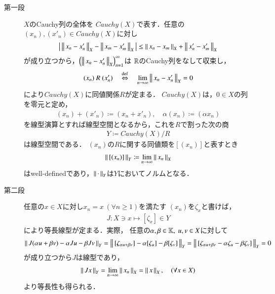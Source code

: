 	\begin{prf}\mbox{}
		\begin{description}
			\item[第一段]
				$X$のCauchy列の全体を
				$Cauchy(X)$で表す．任意の$(x_n),(x'_n) \in Cauchy(X)$に対し
				\begin{align}
					\left|\, \left\|\, x_n - x'_n\, \right\|_{X} - \left\|\, x_m - x'_m\, \right\|_{X}\, \right|
					\leq \left\|\, x_n - x_m\, \right\|_{X} + \left\|\, x'_n - x'_m\, \right\|_{X}
				\end{align}
				が成り立つから，$\left( \left\|\, x_n - x'_n\, \right\|_{X} \right)_{n=1}^\infty$は
				$\mathbb{R}$のCauchy列をなして収束し，
				\begin{align}
					(x_n)\ R\ (x'_n)
					\quad \overset{\mathrm{def}}{\Leftrightarrow} \quad \lim_{n \to \infty} \left\|\, x_n - x'_n\, \right\|_{X} = 0
				\end{align}
				により$Cauchy(X)$に同値関係$R$が定まる．
				$Cauchy(X)$は，$0 \in X$の列を零元と定め，
				\begin{align}
					(x_n) + (x'_n) \coloneqq (x_n + x'_n),
					\quad \alpha (x_n) \coloneqq (\alpha x_n)
				\end{align}
				を線型演算とすれば線型空間となるから，これを$R$で割った次の商
				\begin{align}
					Y \coloneqq Cauchy(X) / R
				\end{align}
				は線型空間である．
				$(x_n)$の$R$に関する同値類を$[(x_n)]$と表すとき
				\begin{align}
					\left\|\, [(x_n)]\, \right\|_{Y} \coloneqq \lim_{n \to \infty} \left\|\, x_n\, \right\|_{X}
					\label{eq:thm_expansion_of_normed_space_1}
				\end{align}
				はwell-definedであり，$\left\|\, \cdot\, \right\|_{Y}$は$Y$においてノルムとなる．
			
			\item[第二段]
				任意の$x \in X$に対し$x_n = x\ (\forall n \geq 1)$を満たす
				$(x_n)$を$\zeta_x$と書けば，
				\begin{align}
					J: X \ni x \longmapsto [\zeta_x] \in Y
					\label{eq:thm_expansion_of_normed_space_2}
				\end{align}
				により等長線型が定まる．実際，
				任意の$\alpha,\beta \in \mathbb{K},\ u,v \in X$に対して
				\begin{align}
					\left\|\, J (\alpha u + \beta v) - \alpha J u - \beta J v\, \right\|_{Y}
					= \left\|\, [\zeta_{\alpha u + \beta v}] - \alpha [\zeta_u] - \beta [\zeta_v]\, \right\|_{Y}
					= \left\|\, [\zeta_{\alpha u + \beta v} - \alpha \zeta_u - \beta \zeta_v]\, \right\|_{Y}
					= 0
				\end{align}
				が成り立つから$J$は線型であり，
				\begin{align}
					\left\|\, J x\, \right\|_{Y} = \lim_{n \to \infty} \left\|\, x_n\, \right\|_{X}
					= \left\|\, x\, \right\|_{X},
					\quad (\forall x \in X)
				\end{align}
				より等長性も得られる．
			

\end{description}
\end{prf}
